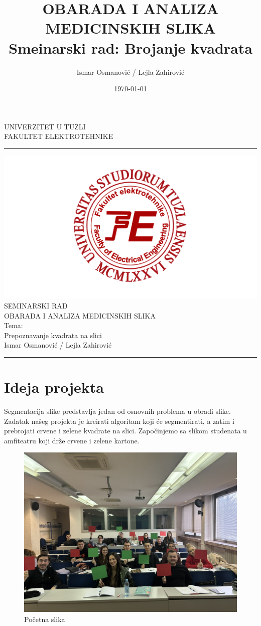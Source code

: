 \documentclass[a4paper,12pt]{article}
\title{OBARADA I ANALIZA MEDICINSKIH SLIKA \\ Smeinarski rad: Brojanje kvadrata}
\author{Ismar Osmanović / Lejla Zahirović}
\date{\today}
\begin{document}
\begin{center}
\thispagestyle{empty}
\large{UNIVERZITET U TUZLI \\ FAKULTET ELEKTROTEHNIKE}

\noindent\rule[7pt]{\linewidth}{0.4pt}


  \includegraphics[width=0.7\linewidth]{fet_logo.png}
\vspace{3cm}\\
{\fontsize{34pt}{28pt}\selectfont SEMINARSKI RAD}\\
\large{OBARADA I ANALIZA MEDICINSKIH SLIKA}\\
\vspace{2cm}
\Huge{Tema:}\\
\Huge{Prepoznavanje kvadrata na slici}\\
\vspace{0.5cm}
\large{Ismar Osmanović / Lejla Zahirović}
\vfill

\noindent\rule[7pt]{\linewidth}{0.4pt}
\end{center}
\newpage
\thispagestyle{empty}
\tableofcontents
\newpage
{} 

\section{Ideja projekta}
Segmentacija slike predstavlja jedan od osnovnih problema u obradi slike. 
Zadatak našeg projekta je kreirati algoritam koji će segmentirati, a zatim i prebrojati crvene i zelene kvadrate na slici.
Započinjemo sa slikom studenata u amfiteatru koji drže crvene i zelene kartone.
\begin{figure}[h]
    \centering
    \includegraphics[width=\textwidth]{../img/studenti.jpg}
    \caption{Početna slika}
    \label{fig:example}
\end{figure}
\newpage
\end{document}
